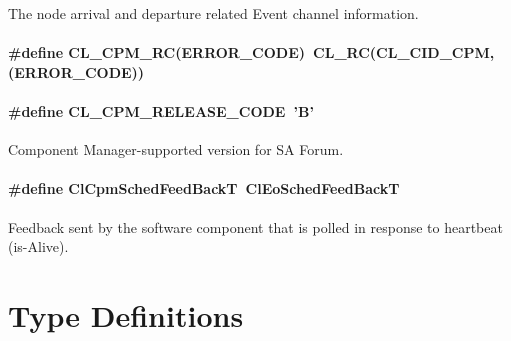 The node arrival and departure related Event channel information. \hypertarget{group__group14_ga77}{
\paragraph[CL\_\-CPM\_\-RC]{\setlength{\rightskip}{0pt plus 5cm}\#define CL\_\-CPM\_\-RC(ERROR\_\-CODE)~CL\_\-RC(CL\_\-CID\_\-CPM, (ERROR\_\-CODE))}\hfill}
\label{group__group14_ga77}


\hypertarget{group__group14_ga52}{
\paragraph[CL\_\-CPM\_\-RELEASE\_\-CODE]{\setlength{\rightskip}{0pt plus 5cm}\#define CL\_\-CPM\_\-RELEASE\_\-CODE~'B'}\hfill}
\label{group__group14_ga52}


Component Manager-supported version for SA Forum. \hypertarget{group__group14_ga64}{
\paragraph[ClCpmSchedFeedBackT]{\setlength{\rightskip}{0pt plus 5cm}\#define Cl\-Cpm\-Sched\-Feed\-Back\-T~Cl\-Eo\-Sched\-Feed\-Back\-T}\hfill}
\label{group__group14_ga64}


Feedback sent by the software component that is polled in response to heartbeat (is-Alive). 








\section{Type Definitions}
